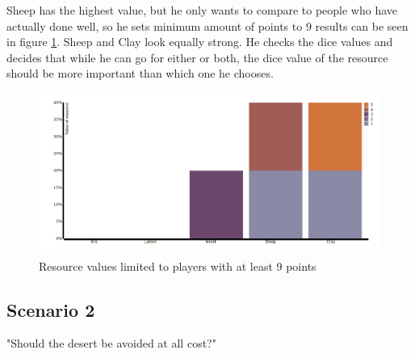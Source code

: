 \documentclass[journal]{vgtc}                %
\begin{document}
\noindent
Sheep has the highest value, but he only wants to compare to people who have
actually done well, so he sets minimum amount of points to 9 results can be
seen in figure \ref{fig:s14}. Sheep and Clay
look equally strong. He checks the dice values and decides that while he
can go for either or both, the dice value of the resource should be more
important than which one he chooses.
\begin{figure}[!h]
  \centering
  \includegraphics[width=\linewidth]{scen1-4.png}
  \caption{Resource values limited to players with at least 9 points}
  \label{fig:s14}
\end{figure}
\noindent

\subsection{Scenario 2}

"Should the desert be avoided at all cost?"
\end{document}
